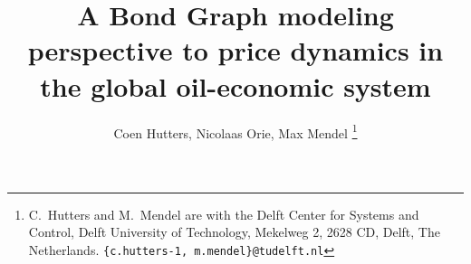\documentclass[letterpaper, 10 pt, conference]{ieeeconf}  %
\title{\LARGE \bf 
A Bond Graph modeling perspective to price dynamics in the global oil-economic system}
\author{
		Coen Hutters, Nicolaas Orie, Max Mendel 
% 
\thanks{
C.~Hutters and M.~Mendel are with the Delft Center for Systems and Control, Delft University of Technology, Mekelweg 2, 2628 CD, Delft, The Netherlands. 
{\tt\small \{c.hutters-1, m.mendel\}@tudelft.nl}
%
}
}
\begin{document}
\maketitle
\thispagestyle{empty}
\pagestyle{empty}


\begin{abstract}
 

\end{abstract}














\newpage
\end{document}
